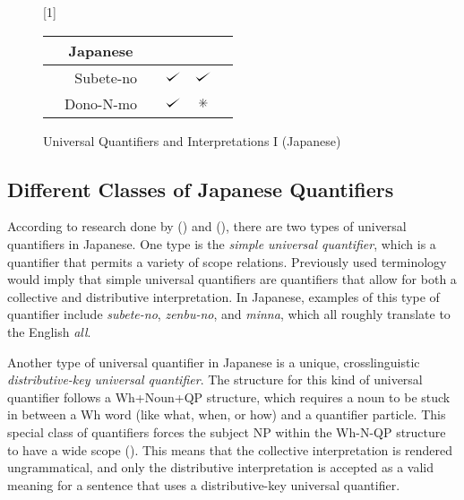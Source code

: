 \documentclass[english, 11pt]{article}
\newcommand{\dwork}{\text{\ding{83}}}
\def\checkmark{\tikz\fill[scale=0.4](0,.35) -- (.25,0) -- (1,.7) -- (.25,.15) -- cycle;}
\begin{document}
\begin{figure}[h]
	\begin{center} \renewcommand*\arraystretch{1.2}
	\scalebox{1}[1]{\begin{tabular}[t]{|rrl||c|c|c|} \hline 
	\multicolumn{3}{|c||}{Japanese} & \sc{Distributive} & \sc{Collective}  \\[0.5ex]
  	 	\hline & Subete-no 		& & $\checkmark$ & $\checkmark$ \\
		\hline & Dono-N-mo		& & $\checkmark$ & $\dwork$ \\
   	 	\hline 
	\end{tabular}} \renewcommand*\arraystretch{1} \end{center}
	\vspace*{-5mm}
	\captionsetup{labelfont=bf}
	\caption[labelfont=bf]{Universal Quantifiers and Interpretations I (Japanese)}
\end{figure}

\subsection{Different Classes of Japanese Quantifiers}
According to research done by (\cite{s1}) and (\cite{s1}), there are two types of universal quantifiers in Japanese. One type is the \emph{simple universal quantifier}, which is a quantifier that permits a variety of scope relations. Previously used terminology would imply that simple universal quantifiers are quantifiers that allow for both a collective and distributive interpretation. In Japanese, examples of this type of quantifier include \emph{subete-no}, \emph{zenbu-no}, and \emph{minna}, which all roughly translate to the English \emph{all}. 

Another type of universal quantifier in Japanese is a unique, crosslinguistic \emph{distributive-key universal quantifier}. The structure for this kind of universal quantifier follows a Wh+Noun+QP structure, which requires a noun to be stuck in between a Wh word (like what, when, or how) and a quantifier particle. This special class of quantifiers forces the subject NP within the Wh-N-QP structure to have a wide scope (\cite{s3}). This means that the collective interpretation is rendered ungrammatical, and only the distributive interpretation is accepted as a valid meaning for a sentence that uses a distributive-key universal quantifier.
\end{document}
